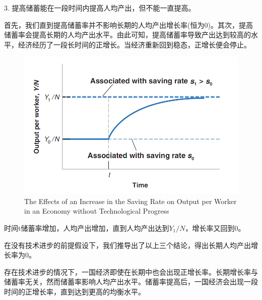 \documentclass{article}
\begin{document}
3. 提高储蓄能在一段时间内提高人均产出，但不能一直提高。

首先，我们直到提高储蓄率并不影响长期的人均产出增长率(恒为0)。其次，提高储蓄率会提高长期的人均产出水平。由此可知，提高储蓄率导致产出达到较高的水平，经济经历了一段长时间的正增长。当经济重新回到稳态，正增长便会停止。

\begin{figure}[H] %
	\centering %
	\includegraphics[width=1\textwidth]{11_4} %
	\caption{The Effects of an Increase
		in the Saving Rate on
		Output per Worker in
		an Economy without
		Technological Progress} %
	\label{Fig.main5} %
\end{figure}

时间t储蓄率增加，人均产出增加，直到人均产出达到$ Y_1/N $，增长率又回到0。

\hspace*{\fill}

在没有技术进步的前提假设下，我们推导出了以上三个结论，得出长期人均产出增长率为0。

存在技术进步的情况下，一国经济即使在长期中也会出现正增长率。长期增长率与储蓄率无关，然而储蓄率影响人均产出水平。储蓄率提高后，一国经济会出现一段时间的正增长率，直到达到更高的均衡水平。
\end{document}
